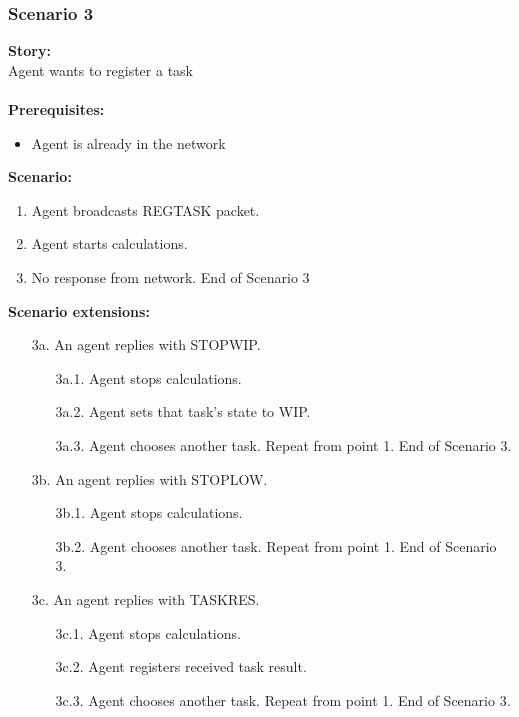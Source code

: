 \documentclass{article}
\begin{document}
\subsubsection{Scenario 3}
\noindent\textbf{Story:} \\
Agent wants to register a task \\\\
\textbf{Prerequisites:}
\begin{itemize}
    \item Agent is already in the network
\end{itemize}
\textbf{Scenario:}
\begin{enumerate}
    \item Agent broadcasts REGTASK packet.
    \item Agent starts calculations.
    \item No response from network. End of Scenario 3
\end{enumerate}
\textbf{Scenario extensions:}
\begin{itemize}
    \item[3a.] An agent replies with STOPWIP.
    \begin{itemize} 
    \item[3a.1.] Agent stops calculations.
    \item[3a.2.] Agent sets that task's state to WIP.
    \item[3a.3.] Agent chooses another task. Repeat from point 1. End of Scenario 3.  
    \end{itemize}
    \item[3b.] An agent replies with STOPLOW.  
    \begin{itemize} 
    \item[3b.1.] Agent stops calculations.
    \item[3b.2.] Agent chooses another task. Repeat from point 1. End of Scenario 3.  
    \end{itemize}
    \item[3c.] An agent replies with TASKRES. 
    \begin{itemize} 
    \item[3c.1.] Agent stops calculations.
    \item[3c.2.] Agent registers received task result. 
    \item[3c.3.] Agent chooses another task. Repeat from point 1. End of Scenario 3.  
    \end{itemize}
\end{itemize}
\end{document}
